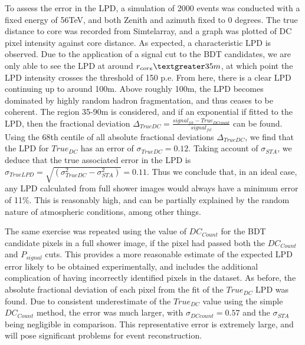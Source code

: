 \documentclass{article}
\begin{document}
To assess the error in the LPD, a simulation of 2000 events was conducted with a fixed energy of 56TeV, and both Zenith and azimuth fixed to 0 degrees. The true distance to core was recorded from Sim\textunderscore telarray, and a graph was plotted of DC pixel intensity against core distance. As expected, a characteristic LPD is observed. Due to the application of a signal cut to the BDT candidates, we are only able to see the LPD at around $r_{core} \textgreater 35m$, at which point the LPD intensity crosses the threshold of 150 p.e. From here, there is a clear LPD continuing up to around 100m. Above roughly 100m, the LPD becomes dominated by highly random hadron fragmentation, and thus ceases to be coherent. The region 35-90m is considered, and if an exponential if fitted to the LPD, then the fractional deviation $\Delta_{TrueDC} = \frac{signal_{fit} - True_{DC count}}{signal_{fit}}$ can be found. Using the 68th centile of all absolute fractional deviations $\Delta_{TrueDC}$, we find that the LPD for $True_{DC}$ has an error of $\sigma_{TrueDC}=0.12$. Taking account of $\sigma_{STA}$, we deduce that the true associated error in the LPD is $\sigma_{TrueLPD} = \sqrt{(\sigma_{TrueDC}^{2} - \sigma_{STA}^{2})} = 0.11$. Thus we conclude that, in an ideal case, any LPD calculated from full shower images would always have a minimum error of 11\%. This is reasonably high, and can be partially explained by the random nature of atmospheric conditions, among other things.

The same exercise was repeated using the value of $DC_{Count}$ for the BDT candidate pixels in a full shower image, if the pixel had passed both the $DC_{Count}$ and $P_{signal}$ cuts. This provides a more reasonable estimate of the expected LPD error likely to be obtained experimentally, and includes the additional complication of having incorrectly identified pixels in the dataset. As before, the absolute fractional deviation of each pixel from the fit of the $True_{DC}$ LPD was found. Due to consistent underestimate of the $True_{DC}$ value using the simple $DC_{Count}$ method, the error was much larger, with $\sigma_{DCcount}=0.57$ and the $\sigma_{STA}$ being negligible in comparison. This representative error is extremely large, and will pose significant problems for event reconstruction.
\end{document}
